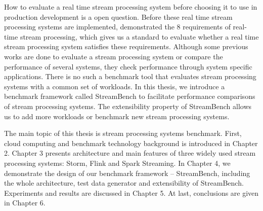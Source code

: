 How to evaluate a real time stream processing system before choosing it to use in production development is a open question.  Before these real time stream processing systems are implemented, \citeauthor{8requirements} demonstrated the 8 requirements\cite{8requirements} of real-time stream processing, which gives us a standard to evaluate whether a real time stream processing system satisfies these requirements.  
Although some previous works\cite{cordovaanalysis, xinhstechblog, samza-benchmark, manoj-sotrm-vs-spark,flink-latency} are done to evaluate a stream processing system or compare the performance of several systems, they check performance through system specific applications. There is no such a benchmark tool that evaluates stream processing systems with a common set of workloads. In this thesis, we introduce a benchmark framework called StreamBench to facilitate performance comparisons of stream processing systems. The extensibility property of StreamBench allows us to add more workloads or benchmark new stream processing systems.

The main topic of this thesis is stream processing systems benchmark. First, cloud computing and benchmark technology background is introduced in Chapter 2. Chapter 3 presents architecture and main features of three widely used stream processing systems: Storm, Flink and Spark Streaming. In Chapter 4, we demonstrate the design of our benchmark framework -- StreamBench, including the whole architecture, test data generator and extensibility of StreamBench. Experiments and results are discussed in Chapter 5. At last, conclusions are given in Chapter 6.

\clearpage